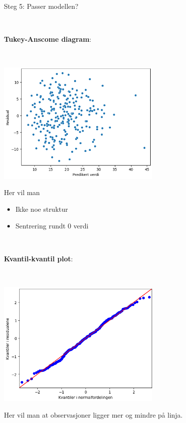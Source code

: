 \documentclass[10pt,ignorenonframetext,]{beamer}
\providecommand{\tightlist}{%
  \setlength{\itemsep}{0pt}\setlength{\parskip}{0pt}}
\begin{document}
\begin{frame}

\begin{block}{Steg 5: Passer modellen?}

\(~\)

\textbf{Tukey-Anscome diagram}:

\(~\)

\centering

\includegraphics[width=0.6\textwidth,height=\textheight]{tukeyAnscombe1.png}

\flushleft

Her vil man

\begin{itemize}
\tightlist
\item
  Ikke noe struktur
\item
  Sentrering rundt 0 verdi
\end{itemize}

\end{block}

\end{frame}

\begin{frame}

\(~\)

\textbf{Kvantil-kvantil plot}:

\(~\)

\centering

\includegraphics[width=0.6\textwidth,height=\textheight]{kvantilplot.png}

\flushleft

Her vil man at observasjoner ligger mer og mindre på linja.

\end{frame}
\end{document}
